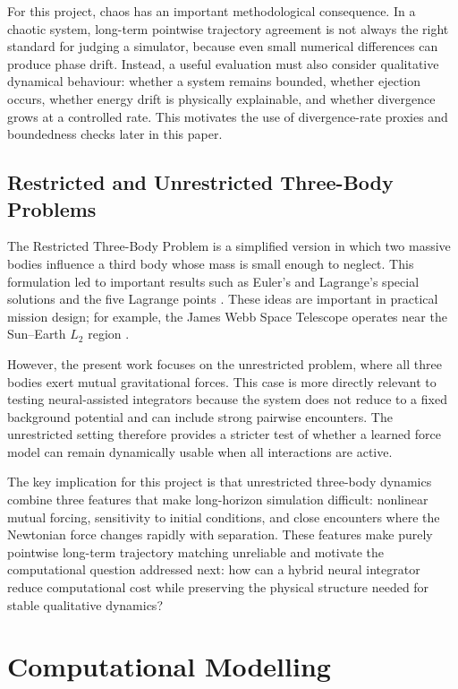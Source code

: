 \documentclass[12pt]{article}
\begin{document}
For this project, chaos has an important methodological consequence. In a chaotic system,
long-term pointwise trajectory agreement is not always the right standard for judging a
simulator, because even small numerical differences can produce phase drift. Instead, a
useful evaluation must also consider qualitative dynamical behaviour: whether a system
remains bounded, whether ejection occurs, whether energy drift is physically explainable,
and whether divergence grows at a controlled rate. This motivates the use of divergence-rate
proxies and boundedness checks later in this paper.

\subsection{Restricted and Unrestricted Three-Body Problems}

The Restricted Three-Body Problem is a simplified version in which two massive bodies
influence a third body whose mass is small enough to neglect. This formulation led to
important results such as Euler's and Lagrange's special solutions and the five Lagrange
points \cite{bistafa2021euler,lagrange1772essai}. These ideas are important in practical mission
design; for example, the James Webb Space Telescope operates near the Sun--Earth $L_2$
region \cite{gardner2006james}.

However, the present work focuses on the unrestricted problem, where all three bodies exert
mutual gravitational forces. This case is more directly relevant to testing neural-assisted
integrators because the system does not reduce to a fixed background potential and can
include strong pairwise encounters. The unrestricted setting therefore provides a stricter
test of whether a learned force model can remain dynamically usable when all interactions
are active.

The key implication for this project is that unrestricted three-body dynamics combine three
features that make long-horizon simulation difficult: nonlinear mutual forcing, sensitivity
to initial conditions, and close encounters where the Newtonian force changes rapidly with
separation. These features make purely pointwise long-term trajectory matching unreliable
and motivate the computational question addressed next: how can a hybrid neural integrator
reduce computational cost while preserving the physical structure needed for stable qualitative dynamics?
\section{Computational Modelling}
\label{sec:comp_modeling}
\end{document}
